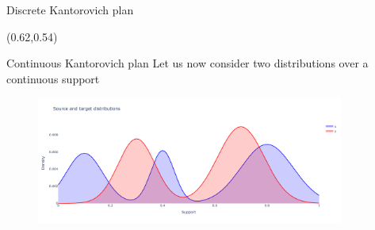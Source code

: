 \documentclass[pdf,aspectratio=169,10pt]{beamer}
\begin{document}
\begin{frame}{ Discrete Kantorovich plan}
\begin{textblock}{0.45} (0.62,0.54)
\small
{}
\end{textblock}
\end{frame}




\begin{frame}{ Continuous Kantorovich plan}
    Let us now consider two  distributions over a continuous support
\begin{minipage}{0.59\textwidth}
\begin{figure}
    \centering
        \includegraphics[width=0.9\textwidth]{../img/kantorovich_continuous_density.pdf}\hspace{2em}
    \end{figure}


\end{minipage}
\end{frame}
\end{document}
